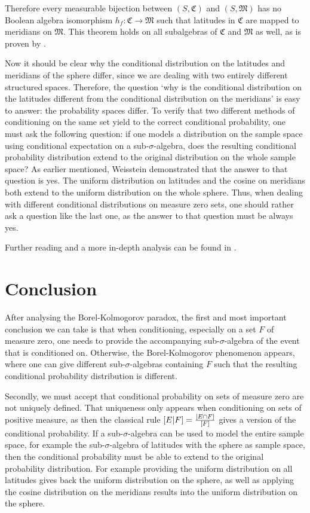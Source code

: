 \documentclass[a4paper]{report}
\theoremstyle{plain}
\theoremstyle{definition}
\theoremstyle{remark}
\numberwithin{equation}{chapter}
\let\P\relax
\DeclareMathOperator{\P}{\mathbb{P}}
\DeclareMathOperator{\1}{\mathbbm{1}}
\begin{document}
Therefore every measurable bijection between $(S,\mathfrak{C})$ and $(S,\mathfrak{M})$ has no Boolean algebra isomorphism $h_f\colon\mathfrak{C}\to\mathfrak{M}$ such that latitudes in $\mathfrak{C}$ are mapped to meridians on $\mathfrak{M}$. This theorem holds on all subalgebras of $\mathfrak{C}$ and $\mathfrak{M}$ as well, as is proven by \cite{Gyenis17}.

Now it should be clear why the conditional distribution on the latitudes and meridians of the sphere differ, since we are dealing with two entirely different structured spaces. Therefore, the question `why is the conditional distribution on the latitudes different from the conditional distribution on the meridians' is easy to answer: the probability spaces differ. To verify that two different methods of conditioning on the same set yield to the correct conditional probability, one must ask the following question: if one models a distribution on the sample space using conditional expectation on a sub-$\sigma$-algebra, does the resulting conditional probability distribution extend to the original distribution on the whole sample space? As earlier mentioned, Weisstein \cite{Weisstein} demonstrated that the answer to that question is yes. The uniform distribution on latitudes and the cosine on meridians both extend to the uniform distribution on the whole sphere. Thus, when dealing with different conditional distributions on measure zero sets, one should rather ask a question like the last one, as the answer to that question must be always yes.

Further reading and a more in-depth analysis can be found in \cite{Gyenis17}.


\section{Conclusion}
After analysing the Borel-Kolmogorov paradox, the first and most important conclusion we can take is that when conditioning, especially on a set $F$ of measure zero, one needs to provide the accompanying sub-$\sigma$-algebra of the event that is conditioned on. Otherwise, the Borel-Kolmogorov phenomenon appears, where one can give different sub-$\sigma$-algebras containing $F$ such that the resulting conditional probability distribution is different.

Secondly, we must accept that conditional probability on sets of measure zero are not uniquely defined. That uniqueness only appears when conditioning on sets of positive measure, as then the classical rule $\P[E|F]=\frac{\P[E\cap F]}{\P[F]}$ gives a version of the conditional probability. If a sub-$\sigma$-algebra can be used to model the entire sample space, for example the sub-$\sigma$-algebra of latitudes with the sphere as sample space, then the conditional probability must be able to extend to the original probability distribution. For example providing the uniform distribution on all latitudes gives back the uniform distribution on the sphere, as well as applying the cosine distribution on the meridians results into the uniform distribution on the sphere.
\end{document}
